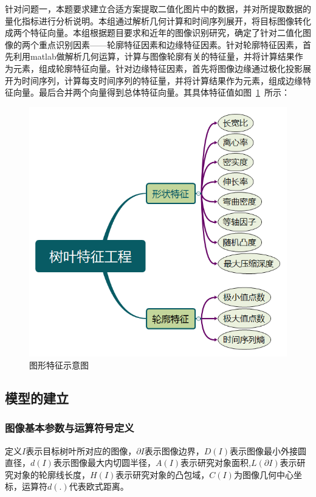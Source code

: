 \documentclass{whutmod}
\begin{document}
	针对问题一，本题要求建立合适方案提取二值化图片中的数据，并对所提取数据的量化指标进行分析说明。本组通过解析几何计算和时间序列展开，将目标图像转化成两个特征向量。本组根据题目要求和近年的图像识别研究，确定了针对二值化图像的两个重点识别因素——轮廓特征因素和边缘特征因素。针对轮廓特征因素，首先利用matlab做解析几何运算，计算与图像轮廓有关的特征量，并将计算结果作为元素，组成轮廓特征向量。针对边缘特征因素，首先将图像边缘通过极化投影展开为时间序列，计算每支时间序列的特征量，并将计算结果作为元素，组成边缘特征向量。最后合并两个向量得到总体特征向量。其具体特征值如图~\ref{77}~所示：
	    \begin{figure}[H]
		\centering
		\includegraphics[width=.6\textwidth]{figures/flt.png}
		\caption{图形特征示意图}\label{77}
    	\end{figure}
	
	    \subsection{模型的建立}
	    \subsubsection{图像基本参数与运算符号定义}
		定义$I$表示目标树叶所对应的图像，$\partial I$表示图像边界，$D(I)$表示图像最小外接圆直径，$d(I)$表示图像最大内切圆半径，$A(I)$表示研究对象面积,$L(\partial I)$表示研究对象的轮廓线长度，$H(I)$表示研究对象的凸包域，$C(I)$为图像几何中心坐标，运算符$d(.)$代表欧式距离。
\end{document}

